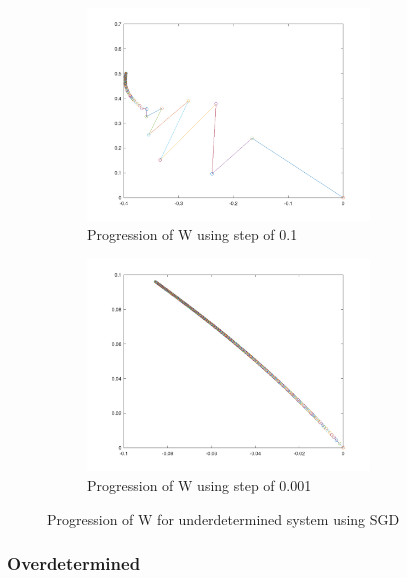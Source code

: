 \documentclass[a4paper]{article}    %
\begin{document}
\begin{figure}[H]
    \centering
    \begin{subfigure}{0.48\textwidth}
        \centering
        \includegraphics[width=7.5cm]{sgd_under_step_0_1}
        \caption{Progression of W using step of 0.1}
        \label{fig:sgd-under-0_1}
    \end{subfigure}
    \hfill
    \begin{subfigure}{0.48\textwidth}
        \centering
        \includegraphics[width=7.5cm]{sgd_under_step_0_001}
        \caption{Progression of W using step of 0.001}
        \label{fig:sgd-under-0_001}
    \end{subfigure}
    \hfill
    \caption{Progression of W for underdetermined system using SGD}
    \label{fig:sdg-under}
\end{figure}

\newpage

\subsubsection{Overdetermined}


\end{document}
